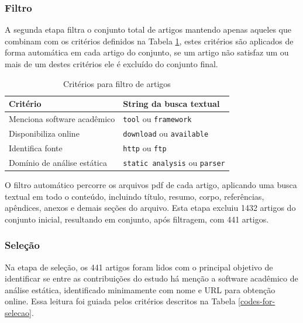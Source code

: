 \subsubsection{Filtro}


A segunda etapa filtra o conjunto total de artigos mantendo apenas aqueles que
combinam com os critérios definidos na Tabela \ref{codes-for-filter}, estes
critérios são aplicados de forma automática em cada artigo do conjunto, se um
artigo não satisfaz um ou mais de um destes critérios ele é excluído do
conjunto final.

\begin{table}[h]
\caption{Critérios para filtro de artigos}
\centering
\begin{tabular}{ l l }
  \hline
  Critério                        & String da busca textual               \\
  \hline
  Menciona software acadêmico     & {\tt tool} ou {\tt framework}         \\
  Disponibiliza online            & {\tt download} ou {\tt available}     \\
  Identifica fonte                & {\tt http} ou {\tt ftp}               \\
  Domínio de análise estática     & {\tt static analysis} ou {\tt parser} \\
  \hline
\end{tabular}
\label{codes-for-filter}
\end{table}

O filtro automático percorre os arquivos pdf de cada artigo, aplicando uma
busca textual em todo o conteúdo, incluindo título, resumo, corpo, referências,
apêndices, anexos e demais seções do arquivo. Esta etapa excluiu 1432 artigos
do conjunto inicial, resultando em conjunto, após filtragem, com 441 artigos.

\subsubsection{Seleção}

Na etapa de seleção, os 441 artigos foram lidos com o principal objetivo
de identificar se entre as contribuições do estudo há menção a software
acadêmico de análise estática, identificado minimamente com nome e URL para
obtenção online. 
Essa leitura foi guiada pelos critérios descritos na Tabela \ref{codes-for-selecao}.


